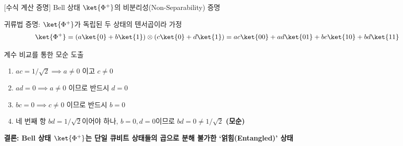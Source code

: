 \documentclass[aspectratio=169, 10pt]{beamer}
\begin{document}
\begin{frame}{[수식 계산 증명] Bell 상태 $\ket{\Phi^+}$의 비분리성(Non-Separability) 증명}
    \begin{qcblock}{귀류법 증명: $\ket{\Phi^+}$가 독립된 두 상태의 텐서곱이라 가정}
        $$\ket{\Phi^+} = (a\ket{0} + b\ket{1}) \otimes (c\ket{0} + d\ket{1}) = ac\ket{00} + ad\ket{01} + bc\ket{10} + bd\ket{11}$$
    \end{qcblock}
    \pause
    \vspace{0.2cm}
    \begin{qcalert}{계수 비교를 통한 모순 도출}
        \begin{enumerate}
            \item $ac = 1/\sqrt{2} \implies a \neq 0$ 이고 $c \neq 0$
            \item $ad = 0 \implies a \neq 0$ 이므로 반드시 \textbf{$d = 0$}
            \item $bc = 0 \implies c \neq 0$ 이므로 반드시 \textbf{$b = 0$}
            \item 네 번째 항 $bd = 1/\sqrt{2}$이어야 하나, $b=0, d=0$이므로 $bd = 0 \neq 1/\sqrt{2}$ \textbf{(모순)}
        \end{enumerate}
    \end{qcalert}
    \pause
    \vspace{0.1cm}
    \begin{center}
        \textbf{결론: Bell 상태 $\ket{\Phi^+}$는 단일 큐비트 상태들의 곱으로 분해 불가한 `얽힘(Entangled)' 상태}
    \end{center}
\end{frame}
\end{document}
